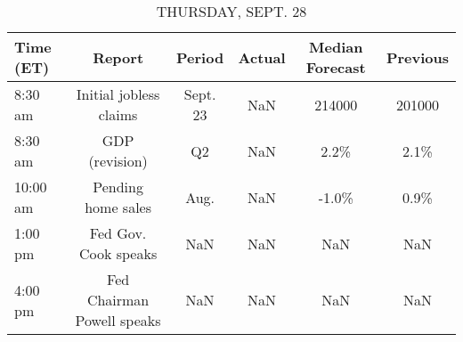 \documentclass{article}%
\begin{document}
%


\begin{table}[htbp]%
\caption{THURSDAY, SEPT. 28}%
\centering%
\begin{adjustbox}{width=1\textwidth}%
\begin{tabular}{lccccc}
\toprule
Time (ET) &                     Report &   Period & Actual & Median Forecast & Previous \\
\midrule
  8:30 am &     Initial jobless claims & Sept. 23 &    NaN &          214000 &   201000 \\
  8:30 am &             GDP (revision) &       Q2 &    NaN &            2.2\% &     2.1\% \\
 10:00 am &         Pending home sales &     Aug. &    NaN &           -1.0\% &     0.9\% \\
  1:00 pm &       Fed Gov. Cook speaks &      NaN &    NaN &             NaN &      NaN \\
  4:00 pm & Fed Chairman Powell speaks &      NaN &    NaN &             NaN &      NaN \\
\bottomrule
\end{tabular}
%
\end{adjustbox}%
\end{table}

%
\end{document}
